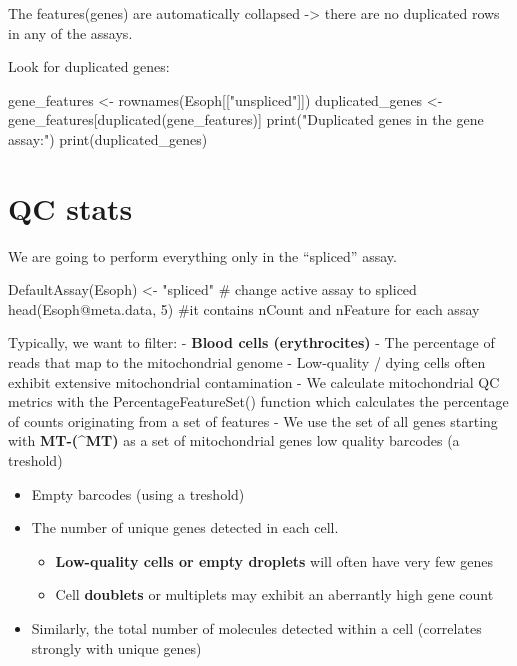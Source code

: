\documentclass[
  letterpaper,
  DIV=11,
  numbers=noendperiod]{scrreprt}
\newenvironment{Shaded}{\begin{snugshade}}{\end{snugshade}}
\newcommand{\CommentTok}[1]{\textcolor[rgb]{0.37,0.37,0.37}{#1}}
\newcommand{\DecValTok}[1]{\textcolor[rgb]{0.68,0.00,0.00}{#1}}
\newcommand{\FunctionTok}[1]{\textcolor[rgb]{0.28,0.35,0.67}{#1}}
\newcommand{\NormalTok}[1]{\textcolor[rgb]{0.00,0.23,0.31}{#1}}
\newcommand{\OtherTok}[1]{\textcolor[rgb]{0.00,0.23,0.31}{#1}}
\newcommand{\SpecialCharTok}[1]{\textcolor[rgb]{0.37,0.37,0.37}{#1}}
\newcommand{\StringTok}[1]{\textcolor[rgb]{0.13,0.47,0.30}{#1}}
\providecommand{\tightlist}{%
  \setlength{\itemsep}{0pt}\setlength{\parskip}{0pt}}\usepackage{longtable,booktabs,array}
\begin{document}
The features(genes) are automatically collapsed -\textgreater{} there
are no duplicated rows in any of the assays.

Look for duplicated genes:

\begin{Shaded}
\begin{Highlighting}[]
\NormalTok{gene\_features }\OtherTok{\textless{}{-}} \FunctionTok{rownames}\NormalTok{(Esoph[[}\StringTok{"unspliced"}\NormalTok{]])}
\NormalTok{duplicated\_genes }\OtherTok{\textless{}{-}}\NormalTok{ gene\_features[}\FunctionTok{duplicated}\NormalTok{(gene\_features)]}
\FunctionTok{print}\NormalTok{(}\StringTok{"Duplicated genes in the \textquotesingle{}gene\textquotesingle{} assay:"}\NormalTok{)}
\FunctionTok{print}\NormalTok{(duplicated\_genes)}
\end{Highlighting}
\end{Shaded}

\section{QC stats}\label{qc-stats}

We are going to perform everything only in the ``spliced'' assay.

\begin{Shaded}
\begin{Highlighting}[]
\FunctionTok{DefaultAssay}\NormalTok{(Esoph) }\OtherTok{\textless{}{-}} \StringTok{"spliced"} \CommentTok{\# change active assay to spliced}
\FunctionTok{head}\NormalTok{(Esoph}\SpecialCharTok{@}\NormalTok{meta.data, }\DecValTok{5}\NormalTok{) }\CommentTok{\#it contains nCount and nFeature for each assay}
\end{Highlighting}
\end{Shaded}

Typically, we want to filter: - \textbf{Blood cells (erythrocites)} -
The percentage of reads that map to the mitochondrial genome -
Low-quality / dying cells often exhibit extensive mitochondrial
contamination - We calculate mitochondrial QC metrics with the
PercentageFeatureSet() function which calculates the percentage of
counts originating from a set of features - We use the set of all genes
starting with \textbf{MT-(\^{}MT)} as a set of mitochondrial genes low
quality barcodes (a treshold)

\begin{itemize}
\tightlist
\item
  Empty barcodes (using a treshold)
\item
  The number of unique genes detected in each cell.

  \begin{itemize}
  \tightlist
  \item
    \textbf{Low-quality cells or empty droplets} will often have very
    few genes
  \item
    Cell \textbf{doublets} or multiplets may exhibit an aberrantly high
    gene count
  \end{itemize}
\item
  Similarly, the total number of molecules detected within a cell
  (correlates strongly with unique genes)
\end{itemize}
\end{document}
